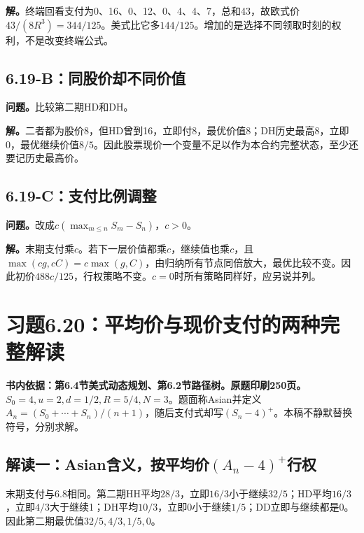\documentclass[11pt,a4paper,UTF8,fontset=fandol]{ctexart}
\begin{document}
\textbf{解。}终端回看支付为0、16、0、12、0、4、4、7，总和43，故欧式价\(43/(8R^3)=\boxed{344/125}\)。美式比它多\(\boxed{144/125}\)。增加的是选择不同领取时刻的权利，不是改变终端公式。

\subsection{6.19-B：同股价却不同价值}\label{bux540cux80a1ux4ef7ux5374ux4e0dux540cux4ef7ux503c}

\textbf{问题。}比较第二期HD和DH。

\textbf{解。}二者都为股价8，但HD曾到16，立即付8，最优价值8；DH历史最高8，立即0，最优继续价值\(8/5\)。因此股票现价一个变量不足以作为本合约完整状态，至少还要记历史最高价。

\subsection{6.19-C：支付比例调整}\label{cux652fux4ed8ux6bd4ux4f8bux8c03ux6574}

\textbf{问题。}改成\(c(\max_{m\le n}S_m-S_n)\)，\(c>0\)。

\textbf{解。}末期支付乘\(c\)。若下一层价值都乘\(c\)，继续值也乘\(c\)，且\(\max(cg,cC)=c\max(g,C)\)，由归纳所有节点同倍放大，最优比较不变。因此初价\(\boxed{488c/125}\)，行权策略不变。\(c=0\)时所有策略同样好，应另说并列。

\bigskip

\section{习题6.20：平均价与现价支付的两种完整解读}\label{ux4e60ux98986.20ux5e73ux5747ux4ef7ux4e0eux73b0ux4ef7ux652fux4ed8ux7684ux4e24ux79cdux5b8cux6574ux89e3ux8bfb}

\textbf{书内依据：第6.4节美式动态规划、第6.2节路径树。原题印刷250页。}\(S_0=4,u=2,d=1/2,R=5/4,N=3\)。题面称Asian并定义\(A_n=(S_0+\cdots+S_n)/(n+1)\)，随后支付式却写\((S_n-4)^+\)。本稿不静默替换符号，分别求解。

\subsection{\texorpdfstring{解读一：Asian含义，按平均价\((A_n-4)^+\)行权}{解读一：Asian含义，按平均价(A\_n-4)\^{}+行权}}\label{ux89e3ux8bfbux4e00asianux542bux4e49ux6309ux5e73ux5747ux4ef7a_n-4ux884cux6743}

末期支付与6.8相同。第二期HH平均\(28/3\)，立即\(16/3\)小于继续\(32/5\)；HD平均\(16/3\)，立即\(4/3\)大于继续1；DH平均\(10/3\)，立即0小于继续\(1/5\)；DD立即与继续都是0。因此第二期最优值\(32/5,4/3,1/5,0\)。
\end{document}
